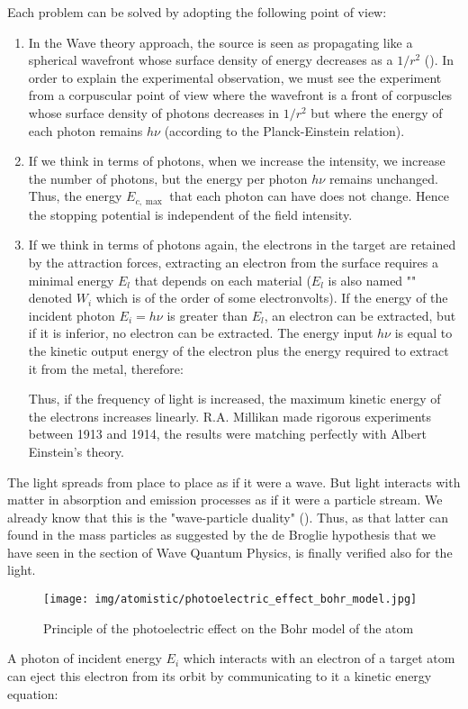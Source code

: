 	Each problem can be solved by adopting the following point of view:
	\begin{enumerate}
		\item In the Wave theory approach, the source is seen as propagating like a spherical wavefront whose surface density of energy decreases as a $1/r^2$ (). In order to explain the experimental observation, we must see the experiment from a corpuscular point of view where the wavefront is a front of corpuscles whose surface density of photons decreases in $1/r^2$ but where the energy of each photon remains $h\nu$ (according to the Planck-Einstein relation).
		
		\item If we think in terms of photons, when we increase the intensity, we increase the number of photons, but the energy per photon $h\nu$ remains unchanged. Thus, the energy $E_{c,\max}$ that each photon can have does not change. Hence the stopping potential is independent of the field intensity.
		
		\item If we think in terms of photons again, the electrons in the target are retained by the attraction forces, extracting an electron from the surface requires a minimal energy $E_l$ that depends on each material ($E_l$ is also named "" denoted $W_i$ which is of the order of some electronvolts). If the energy of the incident photon $E_i=h\nu$ is greater than $E_l$, an electron can be extracted, but if it is inferior, no electron can be extracted. The energy input $h\nu$ is equal to the kinetic output energy of the electron plus the energy required to extract it from the metal, therefore:
		
		Thus, if the frequency of light is increased, the maximum kinetic energy of the electrons increases linearly. R.A. Millikan made rigorous experiments between 1913 and 1914, the results were matching perfectly with Albert Einstein's theory.
	\end{enumerate}
	The light spreads from place to place as if it were a wave. But light interacts with matter in absorption and emission processes as if it were a particle stream. We already know that this is the  "wave-particle duality" (). Thus, as that latter can found in the mass particles as suggested by the de Broglie hypothesis that we have seen in the section of Wave Quantum Physics, is finally verified also for the light.
	\begin{figure}[H]
		\centering
		\texttt{[image: img/atomistic/photoelectric\_effect\_bohr\_model.jpg]}
		\caption{Principle of the photoelectric effect on the Bohr model of the atom}
	\end{figure}
	A photon of incident energy $E_i$ which interacts with an electron of a target atom can eject this electron from its orbit by communicating to it a kinetic energy equation:
	
